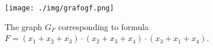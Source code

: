 \begin{figure}[htb]	
\center%
\texttt{[image: ./img/grafogf.png]}
\caption{The  graph $G_{F}$ corresponding to formula $F=(x_1+ x_2+ x_3) \cdot  (x_2+ x_3+ x_4 )\cdot  (x_3 + x_1 + x_4 )$.}
\label{fig:grafogf}
\end{figure}